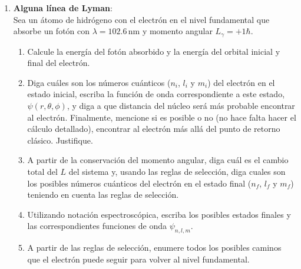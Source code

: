 \documentclass[a4paper,12pt]{article}
\begin{document}
\begin{enumerate}
	\item {\bf{Alguna línea de Lyman}}:\\
		Sea un átomo de hidrógeno con el electrón en el
		nivel fundamental que absorbe un fotón con $\lambda=102.6$\,nm y momento
		angular $L_\gamma = + 1 \hbar$.
		\begin{enumerate}
			\item Calcule la energía del fotón absorbido y la energía del
				orbital inicial y final del electrón.
			\item Diga cuáles son los números cuánticos ($n_i$, $l_i$ y $m_i$)
				del electrón en el estado inicial, escriba la función de onda
				correspondiente a este estado, $\psi(r,\theta,\phi)$, y diga a
				que distancia del núcleo será más probable encontrar al
				electrón. Finalmente, mencione si es posible o no (no hace
				falta hacer el cálculo detallado), encontrar al electrón más
				allá del punto de retorno clásico. Justifique.
			\item A partir de la conservación del momento angular, diga cuál es
				el cambio total del $L$ del sistema y, usando las reglas de
				selección, diga cuales son los posibles números cuánticos del
				electrón en el estado final ($n_f$, $l_f$ y $m_f$) teniendo en
				cuenta las reglas de selección.
			\item Utilizando notación espectroscópica, escriba los posibles
				estados finales y las correspondientes funciones de onda
				$\psi_{n,l,m}$.
			\item A partir de las reglas de selección, enumere todos los
				posibles caminos que el electrón puede seguir para volver al
				nivel fundamental.
		\end{enumerate}
\end{enumerate}
\end{document}
